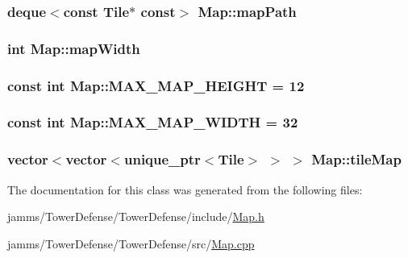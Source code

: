 \hypertarget{class_map_a83b72b69647b50c6c7c7c5bee1ccbc5b}{
\subsubsection[{map\+Path}]{\setlength{\rightskip}{0pt plus 5cm}deque$<$const {\bf Tile}$\ast$ const$>$ Map\+::map\+Path\hspace{0.3cm}{\ttfamily [private]}}}\label{class_map_a83b72b69647b50c6c7c7c5bee1ccbc5b}
\hypertarget{class_map_a9660b072c56d69d3639e364835f0188d}{
\subsubsection[{map\+Width}]{\setlength{\rightskip}{0pt plus 5cm}int Map\+::map\+Width\hspace{0.3cm}{\ttfamily [private]}}}\label{class_map_a9660b072c56d69d3639e364835f0188d}
\hypertarget{class_map_aef313313ef5bbeafeae1f6b66073bace}{
\subsubsection[{M\+A\+X\+\_\+\+M\+A\+P\+\_\+\+H\+E\+I\+G\+H\+T}]{\setlength{\rightskip}{0pt plus 5cm}const int Map\+::\+M\+A\+X\+\_\+\+M\+A\+P\+\_\+\+H\+E\+I\+G\+H\+T = 12\hspace{0.3cm}{\ttfamily [static]}}}\label{class_map_aef313313ef5bbeafeae1f6b66073bace}
\hypertarget{class_map_ae9582bc1e99bdf1ecc5413f81cc95f69}{
\subsubsection[{M\+A\+X\+\_\+\+M\+A\+P\+\_\+\+W\+I\+D\+T\+H}]{\setlength{\rightskip}{0pt plus 5cm}const int Map\+::\+M\+A\+X\+\_\+\+M\+A\+P\+\_\+\+W\+I\+D\+T\+H = 32\hspace{0.3cm}{\ttfamily [static]}}}\label{class_map_ae9582bc1e99bdf1ecc5413f81cc95f69}
\hypertarget{class_map_acfc07b37ba2f49d3183dfca67ea42ecb}{
\subsubsection[{tile\+Map}]{\setlength{\rightskip}{0pt plus 5cm}vector$<$vector$<$unique\+\_\+ptr$<${\bf Tile}$>$ $>$ $>$ Map\+::tile\+Map\hspace{0.3cm}{\ttfamily [private]}}}\label{class_map_acfc07b37ba2f49d3183dfca67ea42ecb}


The documentation for this class was generated from the following files\+:\begin{DoxyCompactItemize}
\item 
jamms/\+Tower\+Defense/\+Tower\+Defense/include/\hyperlink{_map_8h}{Map.\+h}\item 
jamms/\+Tower\+Defense/\+Tower\+Defense/src/\hyperlink{_map_8cpp}{Map.\+cpp}\end{DoxyCompactItemize}
